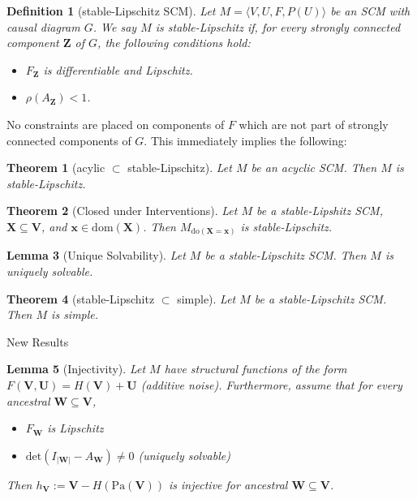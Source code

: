 \documentclass{article}
\newtheorem{theorem}{Theorem}
\newtheorem{lemma}[theorem]{Lemma}
\newtheorem{definition}{Definition}
\begin{document}
\begin{definition}[stable-Lipschitz SCM]
Let $M=\langle V,U,F,P(U)\rangle$ be an SCM with causal diagram $G$. 
We say $M$ is stable-Lipschitz if, for every strongly connected component $\mathbf{Z}$ of $G$, the following conditions hold:
\begin{itemize}
  \item $F_{\mathbf{Z}}$ is differentiable and Lipschitz.
  \item $\rho(A_\mathbf{Z})<1$.
\end{itemize}
\end{definition}

No constraints are placed on components of $F$ which are not part of strongly connected components of $G$. This immediately implies the following:

\begin{theorem}[acylic $\subset$ stable-Lipschitz] \label{acyclic-subset}
Let $M$ be an acyclic SCM. Then $M$ is stable-Lipschitz.
\end{theorem}

\begin{theorem}[Closed under Interventions] \label{int-closed}
Let $M$ be a stable-Lipshitz SCM, $\mathbf{X}\subseteq\mathbf{V}$, and $\mathbf{x}\in\text{dom}(\mathbf{X})$. Then $M_{\text{do}(\mathbf{X}=\mathbf{x})}$ is stable-Lipschitz.
\end{theorem}

\begin{lemma}[Unique Solvability] \label{unique-solvable}
Let $M$ be a stable-Lipschitz SCM. Then $M$ is uniquely solvable.
\end{lemma}

\begin{theorem}[stable-Lipschitz $\subset$ simple] \label{simple-subset}
Let $M$ be a stable-Lipschitz SCM. Then $M$ is simple.
\end{theorem}





\color{red} New Results \color{black}


\begin{lemma}[Injectivity] \label{injective}
Let $M$ have structural functions of the form $F(\mathbf{V},\mathbf{U})=H(\mathbf{V})+\mathbf{U}$ (additive noise). Furthermore, assume that for every ancestral $\mathbf{W}\subseteq \mathbf{V}$, 
\begin{itemize}
  \item $F_{\mathbf{W}}$ is Lipschitz
  \item $\text{det}(I_{|\mathbf{W}|}-A_\mathbf{W})\neq 0$ (uniquely solvable)
\end{itemize}
Then $h_\mathbf{V}:=\mathbf{V}-H(\text{Pa}(\mathbf{V}))$ is injective for ancestral $\mathbf{W}\subseteq\mathbf{V}$.
\end{lemma}
\end{document}
